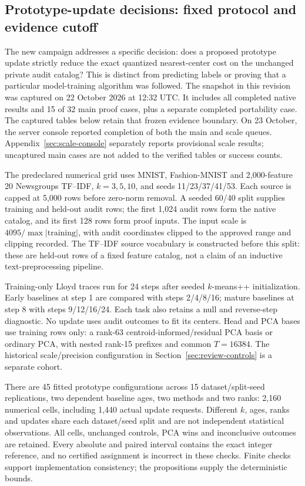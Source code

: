 \subsection{Prototype-update decisions: fixed protocol and evidence cutoff}\label{sec:paired-experiments}
The new campaign addresses a specific decision: does a proposed prototype
update strictly reduce the exact quantized nearest-center cost on the unchanged
private audit catalog? This is distinct from predicting labels or proving that
a particular model-training algorithm was followed. The snapshot in this
revision was captured on 22 October 2026 at 12:32 UTC. It includes all completed
native results and 15 of 32 main proof cases, plus a separate completed
portability case. The captured tables below retain that frozen evidence boundary. On 23 October,
the server console reported completion of both the main and scale queues.
Appendix~\ref{sec:scale-console} separately reports provisional scale results;
uncaptured main cases are not added to the verified tables or success counts.

The predeclared numerical grid uses MNIST, Fashion-MNIST and 2,000-feature
20 Newsgroups TF--IDF, $k=3,5,10$, and seeds 11/23/37/41/53. Each source is capped
at 5,000 rows before zero-norm removal. A seeded 60/40 split supplies training
and held-out audit rows; the first 1,024 audit rows form the native catalog,
and its first 128 rows form proof inputs. The input scale is
$4095/\max|\text{training}|$, with audit coordinates clipped to the approved
range and clipping recorded. The TF--IDF source vocabulary is constructed
before this split: these are held-out rows of a fixed feature catalog, not a
claim of an inductive text-preprocessing pipeline.

Training-only Lloyd traces run for 24 steps after seeded $k$-means++
initialization. Early baselines at step 1 are compared with steps 2/4/8/16;
mature baselines at step 8 with steps 9/12/16/24. Each task also retains a null
and reverse-step diagnostic. No update uses audit outcomes to fit its centers.
Head and PCA bases use training rows only: a rank-63 centroid-informed/residual
PCA basis or ordinary PCA, with nested rank-15 prefixes and common $T=16384$.
The historical scale/precision configuration in Section~\ref{sec:review-controls}
is a separate cohort.

There are 45 fitted prototype configurations across 15 dataset/split-seed
replications, two dependent baseline ages, two methods and two ranks:
2,160 numerical cells, including 1,440 actual update requests. Different $k$,
ages, ranks and updates share each dataset/seed split and are not independent
statistical observations. All cells, unchanged controls, PCA wins and
inconclusive outcomes are retained. Every absolute and paired interval contains
the exact integer reference, and no certified assignment is incorrect in these
checks. Finite checks support implementation consistency; the propositions
supply the deterministic bounds.

